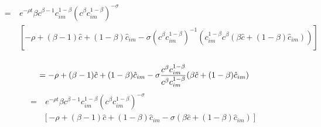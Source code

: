 \begin{equation*}
\begin{split}
	~\quad = ~& e^{- \rho t} \beta c^{\beta -1} c_{im}^{1- \beta} (c^{\beta} c_{im}^{1- \beta})^{- \sigma} \\
		&\left [ - \rho + (\beta -1)\hat{c}+(1-\beta)\hat{c}_{im} - \sigma (c^{\beta} c_{im}^{1- \beta})^{-1} (c_{im}^{1- \beta} c^{\beta} (\beta \hat{c} + (1- \beta) \hat{c}_{im})) \right]\\
\end{split}
\end{equation*}


\begin{equation*}
		~\quad = - \rho + (\beta - 1) \hat{c} + (1- \beta) \hat{c}_{im} - \sigma \frac{c^{ \beta} c_{im}^{1- \beta}} {c^{\beta} c_{im}^{1- \beta}} (\beta \hat{c} + (1- \beta) \hat{c}_{im})\\
\end{equation*}
\begin{equation*}
\begin{split}
			\quad~ = &~ e^{- \rho t} \beta c^{\beta -1} c_{im}^{1- \beta} (c^{\beta} c_{im}^{1- \beta} )^{- \sigma}\\
		&\left [ - \rho + (\beta-1) \hat{c} + (1- \beta) \hat{c}_{im} - \sigma (\beta \hat{c} + (1- \beta) \hat{c}_{im}) \right ]\\
\end{split}
\end{equation*}

